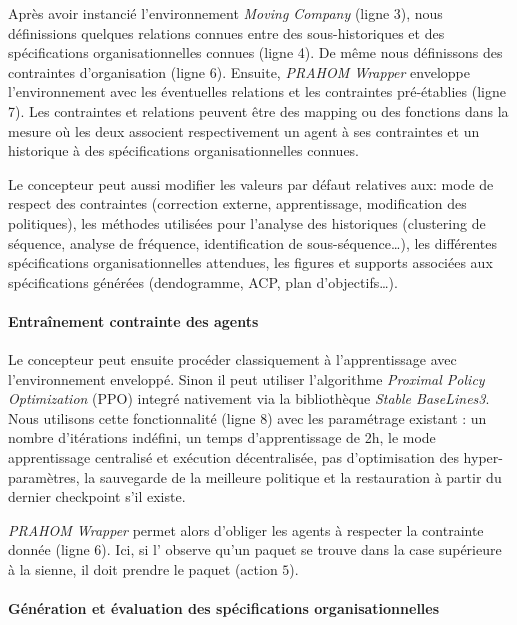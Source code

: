 \documentclass[demonstration]{jfsma}
\newcounter{relation}
\begin{document}
Après avoir instancié l'environnement \emph{Moving Company} (ligne 3), nous définissions quelques relations connues entre des sous-historiques et des spécifications organisationnelles connues (ligne 4). De même nous définissons des contraintes d'organisation (ligne 6). Ensuite, \emph{PRAHOM Wrapper} enveloppe l'environnement avec les éventuelles relations et les contraintes pré-établies (ligne 7). Les contraintes et relations peuvent être des mapping ou des fonctions dans la mesure où les deux associent respectivement un agent à ses contraintes et un historique à des spécifications organisationnelles connues.

Le concepteur peut aussi modifier les valeurs par défaut relatives aux: mode de respect des contraintes (correction externe, apprentissage, modification des politiques), les méthodes utilisées pour l'analyse des historiques (clustering de séquence, analyse de fréquence, identification de sous-séquence\dots), les différentes spécifications organisationnelles attendues, les figures et supports associées aux spécifications générées (dendogramme, ACP, plan d'objectifs\dots).

\paragraph{Entraînement contrainte des agents}

Le concepteur peut ensuite procéder classiquement à l'apprentissage avec l'environnement enveloppé. Sinon il peut utiliser l'algorithme \emph{Proximal Policy Optimization} (PPO) integré nativement via la bibliothèque \emph{Stable BaseLines3}. Nous utilisons cette fonctionnalité (ligne 8) avec les paramétrage existant  : un nombre d'itérations indéfini, un temps d'apprentissage de 2h, le mode apprentissage centralisé et exécution décentralisée, pas d'optimisation des hyper-paramètres, la sauvegarde de la meilleure politique et la restauration à partir du dernier checkpoint s'il existe.

\emph{PRAHOM Wrapper} permet alors d'obliger les agents à respecter la contrainte donnée (ligne 6). Ici, si l' observe qu'un paquet se trouve dans la case supérieure à la sienne, il doit prendre le paquet (action $5$).

\paragraph{Génération et évaluation des spécifications organisationnelles }
\end{document}
